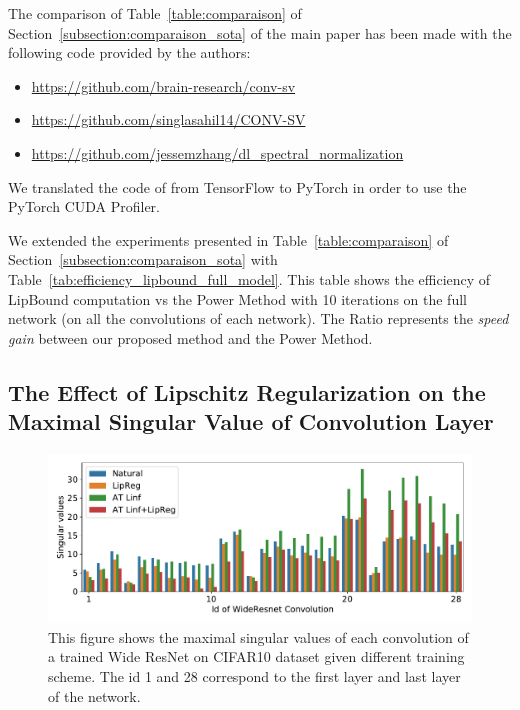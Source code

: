 The comparison of Table~\ref{table:comparaison} of Section~\ref{subsection:comparaison_sota} of the main paper has been made with the following code provided by the authors: 
\begin{itemize}
    \item {} \url{https://github.com/brain-research/conv-sv}
    \item {} \url{https://github.com/singlasahil14/CONV-SV}
    \item {} \url{https://github.com/jessemzhang/dl_spectral_normalization}
\end{itemize}
We translated the code of \cite{sedghi2018iclr} from TensorFlow to PyTorch in order to use the PyTorch CUDA Profiler.

We extended the experiments presented in Table~\ref{table:comparaison} of Section~\ref{subsection:comparaison_sota} with Table~\ref{tab:efficiency_lipbound_full_model}.
This table shows the efficiency of LipBound computation vs the Power Method with 10 iterations on the full network (\ie on all the convolutions of each network).
The Ratio represents the \emph{speed gain} between our proposed method and the Power Method. 



\subsection{The Effect of Lipschitz Regularization on the Maximal Singular Value of Convolution Layer}

\begin{figure}[htb]
    \centering
    \includegraphics[scale=0.55]{figures/chapter4/singular_values.pdf}
    \caption{This figure shows the maximal singular values of each convolution of a trained Wide ResNet on CIFAR10 dataset given different training scheme. The id 1 and 28 correspond to the first layer and last layer of the network.}
    \label{figure:singular_values}
\end{figure}%

